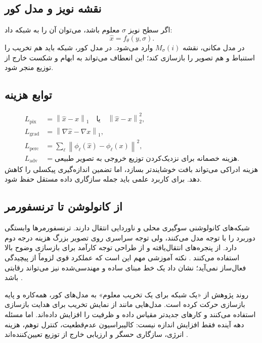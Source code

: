 \documentclass[12pt,openany,oneside]{book}
\newcommand{\norm}[1]{\left\lVert #1\right\rVert}
\begin{document}
\subsection{نقشه نویز و مدل کور}
اگر سطح نویز \(\sigma\) معلوم باشد، می‌توان آن را به شبکه داد:
\begin{equation}
\widehat x=f_\theta(y,\sigma).
\end{equation}
در مدل مکانی، نقشه \(M_\sigma(i)\) وارد می‌شود. در مدل کور، شبکه باید هم تخریب را استنباط و هم تصویر را بازسازی کند؛
این انعطاف می‌تواند به ابهام و شکست خارج از توزیع منجر شود.

\subsection{توابع هزینه}
\begin{align}
L_{\mathrm{pix}}&=\norm{\widehat x-x}_1\quad\text{یا}\quad\norm{\widehat x-x}_2^2,\\
L_{\mathrm{grad}}&=\norm{\nabla\widehat x-\nabla x}_1,\\
L_{\mathrm{perc}}&=\sum_\ell\norm{\phi_\ell(\widehat x)-\phi_\ell(x)}^2,\\
L_{\mathrm{adv}}&=\text{هزینه خصمانه برای نزدیک‌کردن توزیع خروجی به تصویر طبیعی}.
\end{align}
هزینه ادراکی می‌تواند بافت خوشایندتر بسازد، اما تضمین اندازه‌گیری پیکسلی را کاهش دهد. برای کاربرد علمی باید جمله سازگاری داده مستقل حفظ شود.

\subsection{از کانولوشن تا ترنسفورمر}
شبکه‌های کانولوشنی سوگیری محلی و ناوردایی انتقال دارند. ترنسفورمرها وابستگی دوربرد را با توجه مدل می‌کنند،
ولی توجه سراسری روی تصویر بزرگ هزینه درجه دوم دارد.  از پنجره‌های انتقال‌یافته و  از طراحی توجه کارآمد برای بازسازی وضوح بالا استفاده می‌کنند \cite{liang2021swinir,zamir2022restormer}.
نکته آموزشی مهم این است که عملکرد قوی لزوماً از پیچیدگی فعال‌ساز نمی‌آید؛  نشان داد یک خط مبنای ساده و مهندسی‌شده نیز می‌تواند رقابتی باشد \cite{chen2022nafnet}.

\begin{futurebox}
روند پژوهش از «یک شبکه برای یک تخریب معلوم» به مدل‌های کور، همه‌کاره و پایه بازسازی حرکت کرده است.
مدل‌هایی مانند  از نمایش تخریب برای هدایت بازسازی استفاده می‌کنند و کارهای جدیدتر مقیاس داده و ظرفیت را افزایش داده‌اند.
اما مسئله دهه آینده فقط افزایش اندازه نیست: کالیبراسیون عدم‌قطعیت، کنترل توهم، هزینه انرژی، سازگاری حسگر و ارزیابی خارج از توزیع تعیین‌کننده‌اند \cite{potlapalli2023promptir,li2025foundir}.
\end{futurebox}
\end{document}
